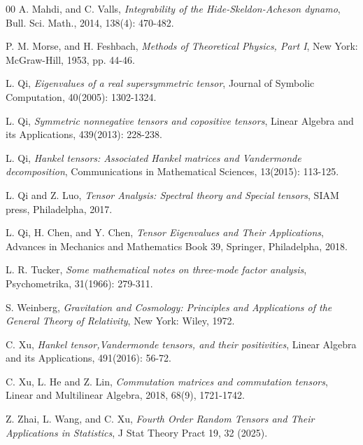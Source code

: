 \documentclass[11pt, oneside]{article}  %
\begin{document}
\begin{thebibliography}{00}
A. Mahdi, and C. Valls, 
\textit{Integrability of the Hide-Skeldon-Acheson dynamo}, 
Bull. Sci. Math., 2014, 138(4): 470-482.

P. M.  Morse, and H. Feshbach,  
\textit{Methods of Theoretical Physics, Part I},
New York: McGraw-Hill, 1953, pp. 44-46.

L. Qi,
\textit{Eigenvalues of a real supersymmetric tensor}, 
Journal of Symbolic Computation, 40(2005): 1302-1324.

L. Qi,
\textit{Symmetric nonnegative tensors and copositive tensors}, 
Linear Algebra and its Applications, 439(2013): 228-238.
 
 L. Qi, 
 \textit{Hankel tensors: Associated Hankel matrices and Vandermonde decomposition}, 
Communications in Mathematical Sciences, 13(2015): 113-125.

L. Qi and Z. Luo, 
\textit{Tensor Analysis: Spectral theory and Special tensors}, 
SIAM press, Philadelpha, 2017.

L. Qi, H. Chen, and Y. Chen, 
\textit{Tensor Eigenvalues and Their Applications}, 
Advances in Mechanics and Mathematics Book 39, 
Springer, Philadelpha, 2018.

L. R. Tucker,  
\textit{Some mathematical notes on three-mode factor analysis}, 
Psychometrika, 31(1966): 279-311.
 
S. Weinberg, 
\textit{Gravitation and Cosmology: Principles and Applications of the General Theory of Relativity}, 
New York: Wiley, 1972.

C. Xu, \textit{Hankel tensor,Vandermonde tensors, and their positivities}, 
Linear Algebra and its Applications, 491(2016): 56-72.

C. Xu, L. He and Z. Lin,
\textit{Commutation matrices and commutation tensors}, 
Linear and Multilinear Algebra, 2018, 68(9), 1721-1742. 

Z. Zhai, L. Wang, and C. Xu, 
\textit{Fourth Order Random Tensors and Their Applications in Statistics}, 
J Stat Theory Pract 19, 32 (2025).  

 
\end{thebibliography}
\end{document}
